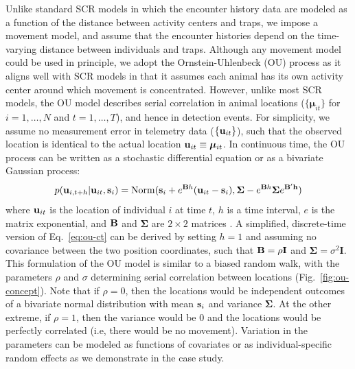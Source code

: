 \documentclass[12pt]{article}
\newcommand{\bsi}{{\bf s}_i}
\newcommand{\bu}{{\bf u}}
\newcommand{\buit}{{\bf u}_{it}}
\begin{document}
Unlike standard SCR models in which the encounter history data are
modeled as a function of the distance between activity centers and
traps, we impose a movement model, and assume that the encounter
histories depend on the time-varying distance between individuals and
traps. Although any movement model could be used in principle, we
adopt %
the Ornstein-Uhlenbeck (OU)
process as it aligns well with SCR models in that it
assumes each animal has its own activity center around which
movement is concentrated. However, unlike most SCR models, the OU
model describes serial correlation in animal locations
($\{{\bm \mu}_{it}\}$ for $i=1,\dots,N$ and $t=1,\dots,T$), and hence in
detection events. For simplicity, we assume no measurement error in
telemetry data ($\{\buit\}$), such that the observed 
location is identical to the actual location $\buit \equiv {\bm
  \mu}_{it}$. In continuous time, the OU process can be written as
a stochastic differential equation or as a bivariate Gaussian process:
\begin{equation}
  p(\bu_{i,t+h}|\buit,\bsi) = \mathrm{Norm}(\bsi + e^{{\bf B}h}(\buit-\bsi), \bm{\Sigma} - e^{{\bf B} h} {\bm \Sigma} e^{\bf{B}' h})
  \label{eq:ou-ct}
\end{equation}
where $\buit$ is the location of individual $i$ at time $t$, $h$ is
a time interval, $e$ is the matrix exponential, and $\bf B$ and $\bm
\Sigma$ are $2\times 2$ matrices 
\citep{dunn_gipson:1977,blackwell:1997,blackwell_etal:2016}.
A simplified, discrete-time version of Eq.~\ref{eq:ou-ct} can be
derived by setting $h=1$ and assuming no covariance between the two
position coordinates, such that
${\bf B} = \rho \mathbf{I}$ and
${\bm \Sigma} = \sigma^2\mathbf{I}$. %
This formulation of the OU model is similar to a biased random walk, 
with the parameters $\rho$ and $\sigma$ determining serial
correlation between locations (Fig.~\ref{fig:ou-concept}). Note that
if $\rho=0$, then the locations would be independent outcomes of
a bivariate normal distribution with mean $\bsi$ and variance $\bm
\Sigma$. At the other extreme, if $\rho=1$, then the variance would
be 0 and the locations would be perfectly correlated (i.e, there would
be no movement). 
Variation in the parameters can be modeled as functions of 
covariates or as individual-specific random effects as we demonstrate
in the case study.
\end{document}
